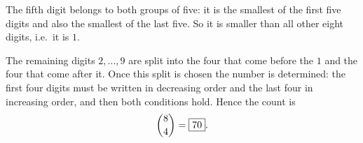 The fifth digit belongs to both groups of five: it is the smallest of the first five digits and also the smallest of the last five. So it is smaller than all other eight digits, i.e.\ it is $1$.

The remaining digits $2,\dots,9$ are split into the four that come before the $1$ and the four that come after it. Once this split is chosen the number is determined: the first four digits must be written in decreasing order and the last four in increasing order, and then both conditions hold. Hence the count is
\[
\dbinom84=\boxed{70}.
\]

